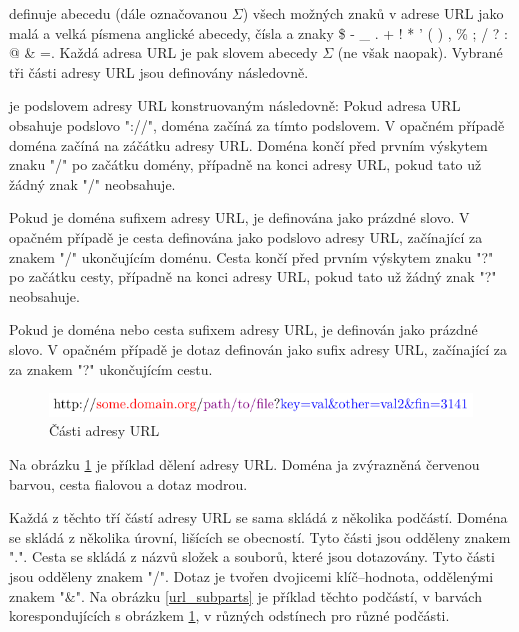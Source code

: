 \cite{berners-lee_uniform_1994} definuje abecedu (dále označovanou \( \Sigma \)) všech možných znaků v adrese URL jako malá a velká písmena anglické abecedy, čísla a znaky \$ - \_ . + ! * ' ( ) , \% ; / ? : @ \& =. Každá adresa URL je pak slovem abecedy \( \Sigma \) (ne však naopak). Vybrané tři části adresy URL jsou definovány následovně.
\begin{define}
	 je podslovem adresy URL konstruovaným následovně: Pokud adresa URL obsahuje podslovo "://", doména začíná za tímto podslovem. V opačném případě doména začíná na záčátku adresy URL. Doména končí před prvním výskytem znaku "/" po začátku domény, případně na konci adresy URL, pokud tato už žádný znak "/" neobsahuje.
\end{define}
\begin{define}
	Pokud je doména sufixem adresy URL, je  definována jako prázdné slovo. V opačném případě je cesta definována jako podslovo adresy URL, začínající za znakem "/" ukončujícím doménu. Cesta končí před prvním výskytem znaku "?" po začátku cesty, případně na konci adresy URL, pokud tato už žádný znak "?" neobsahuje.
\end{define}
\begin{define}
	Pokud je doména nebo cesta sufixem adresy URL, je  definován jako prázdné slovo. V opačném případě je dotaz definován jako sufix adresy URL, začínající za za znakem "?" ukončujícím cestu.
\end{define}

\begin{figure}[h]
	\caption{Části adresy URL}\label{url_parts}
	\centering
	\includegraphics{images/url_parts/url_parts.pdf}
\end{figure}

Na obrázku \ref{url_parts} je příklad dělení adresy URL. Doména ja zvýrazněná červenou barvou, cesta fialovou a dotaz modrou.

Každá z těchto tří částí adresy URL se sama skládá z několika podčástí. Doména se skládá z několika úrovní, lišících se obecností. Tyto části jsou odděleny znakem ".". Cesta se skládá z názvů složek a souborů, které jsou dotazovány. Tyto části jsou odděleny znakem "/". Dotaz je tvořen dvojicemi klíč--hodnota, oddělenými znakem "\&". Na obrázku \ref{url_subparts} je příklad těchto podčástí, v barvách korespondujících s obrázkem \ref{url_parts}, v různých odstínech pro různé podčásti.

